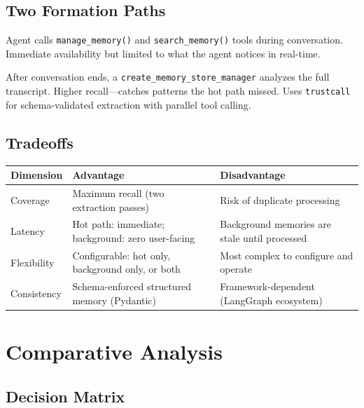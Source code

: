 \documentclass[11pt, letterpaper]{article}
\begin{document}
\subsection{Two Formation Paths}

\begin{description}[leftmargin=2em]
    \item[Hot Path (``Conscious'')] Agent calls \texttt{manage\_memory()} and
        \texttt{search\_memory()} tools during conversation. Immediate availability
        but limited to what the agent notices in real-time.
    \item[Background Path (``Subconscious'')] After conversation ends, a
        \texttt{create\_memory\_store\_manager} analyzes the full transcript.
        Higher recall---catches patterns the hot path missed. Uses \texttt{trustcall}
        for schema-validated extraction with parallel tool calling.
\end{description}

\subsection{Tradeoffs}

\begin{table}[h]
\centering
\begin{tabularx}{\textwidth}{lXX}
\toprule
\textbf{Dimension} & \textbf{Advantage} & \textbf{Disadvantage} \\
\midrule
Coverage & Maximum recall (two extraction passes) & Risk of duplicate processing \\
Latency & Hot path: immediate; background: zero user-facing & Background memories are stale until processed \\
Flexibility & Configurable: hot only, background only, or both & Most complex to configure and operate \\
Consistency & Schema-enforced structured memory (Pydantic) & Framework-dependent (LangGraph ecosystem) \\
\bottomrule
\end{tabularx}
\end{table}

\section{Comparative Analysis}

\subsection{Decision Matrix}
\end{document}
